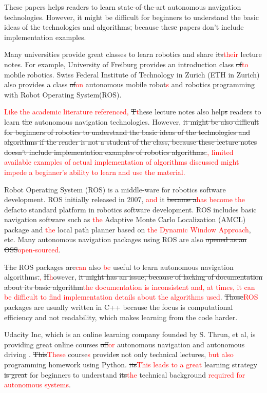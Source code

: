 \documentclass{bmvc2k}
\def\jwd{\textcolor{red}}
\begin{document}
These papers help\st{s} readers to learn state\jwd{-}of\jwd{-}the\jwd{-}art autonomous navigation technologies.
However, it might be difficult for beginners to understand the basic ideas of the technologies and algorithms\st{,} because the\st{se} papers don't include implementation examples.

Many universities provide great classes to learn robotics and share \st{its}\jwd{their} lecture notes.
For example, University of Freiburg provides an introduction class \st{of}\jwd{to} mobile robotics\cite{course1}.
Swiss Federal Institute of Technology in Zurich (ETH in Zurich) also provides a class \st{of}\jwd{on} autonomous mobile robot\jwd{s}\cite{course2} and robotics programming with Robot Operating System(ROS)\cite{course3}.

\jwd{Like the academic literature referenced, } \st{T}\jwd{t}hese lecture notes also help\st{s} readers to learn \st{the} autonomous navigation technologies.
However, \st{it might be also difficult for beginners of robotics to understand the basic ideas of the technologies and algorithms if the reader is not a student of the class, because these lecture notes doesn't include implementation examples of robotics algorithms.}\jwd{, limited available examples of actual implementation of algorithms discussed might impede a beginner's ability to learn and use the material.}

Robot Operating System (ROS) is a middle-ware for robotics software development\cite{ros}\cite{rospaper}.
ROS initially released in 2007, \jwd{and} it \st{became a}\jwd{has become the} defacto standard platform in robotics software development.
ROS includes basic navigation software such as \jwd{the} Adaptive Monte Carlo Localization (AMCL) package and \jwd{the} local path planner based on \jwd{the Dynamic Window Approach}, etc\cite{rosnavigation}.
Many autonomous navigation packages using ROS are also \st{opened as an OSS}\jwd{open-sourced}.

\st{The }ROS packages \st{are}\jwd{can} also \jwd{be} useful to learn autonomous navigation algorithms\st{.}\jwd{,}
\st{H}\jwd{h}owever, \st{it might has an issue, because of lacking of documentation about its basic algorithm}\jwd{the documentation is inconsistent and, at times, it can be difficult to find implementation details about the algorithms used}.
\st{Those}\jwd{ROS} packages are usually written in C++ because the focus is computational efficiency and not readability, which makes learning from the code harder.

Udacity Inc, which is an online learning company founded by S. Thrun, et al, is providing great online courses \st{of}\jwd{for} autonomous navigation and autonomous driving \cite{udacity}.
\st{This}\jwd{These} course\jwd{s} provide\st{s} not only technical lectures, \jwd{but also} programming homework using Python.
\st{its}\jwd{This leads to a great} learning strategy \st{is great} for beginners to understand \st{its}\jwd{the} technical background \jwd{required for autonomous systems}.
\end{document}

